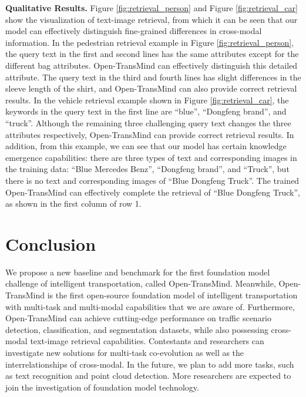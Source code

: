 \documentclass[10pt,twocolumn,letterpaper]{article}
\begin{document}
\textbf{Qualitative Results.} Figure \ref{fig:retrieval_person} and Figure \ref{fig:retrieval_car} show the visualization of text-image retrieval, from which it can be seen that our model can effectively distinguish fine-grained differences in cross-modal information. In the pedestrian retrieval example in Figure \ref{fig:retrieval_person}, the query text in the first and second lines has the same attributes except for the different bag attributes. Open-TransMind can effectively distinguish this detailed attribute. The query text in the third and fourth lines has slight differences in the sleeve length of the shirt, and Open-TransMind can also provide correct retrieval results. In the vehicle retrieval example shown in Figure \ref{fig:retrieval_car}, the keywords in the query text in the first line are ``blue'', ``Dongfeng brand'', and ``truck''. Although the remaining three challenging query text changes the three attributes respectively, Open-TransMind can provide correct retrieval results. In addition, from this example, we can see that our model has certain knowledge emergence capabilities: there are three types of text and corresponding images in the training data: ``Blue Mercedes Benz'', ``Dongfeng brand'', and ``Truck'', but there is no text and corresponding images of ``Blue Dongfeng Truck''. The trained Open-TransMind can effectively complete the retrieval of ``Blue Dongfeng Truck'', as shown in the first column of row 1.

\section{Conclusion}
We propose a new baseline and benchmark for the first foundation model challenge of intelligent transportation, called Open-TransMind. Meanwhile, Open-TransMind is the first open-source foundation model of intelligent transportation with multi-task and multi-modal capabilities that we are aware of. Furthermore, Open-TransMind can achieve cutting-edge performance on traffic scenario detection, classification, and segmentation datasets, while also possessing cross-modal text-image retrieval capabilities. Contestants and researchers can investigate new solutions for multi-task co-evolution as well as the interrelationships of cross-modal. In the future, we plan to add more tasks, such as text recognition and point cloud detection. More researchers are expected to join the investigation of foundation model technology.
{\small


}
\end{document}

